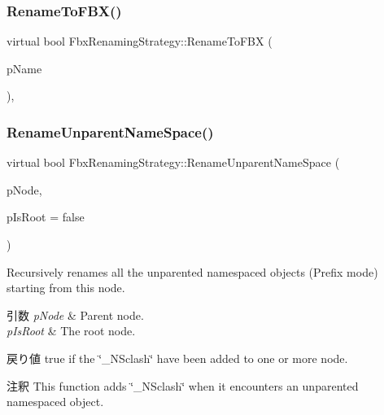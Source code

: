 \subsubsection{\texorpdfstring{Rename\+To\+F\+B\+X()}{RenameToFBX()}}
{\footnotesize\ttfamily virtual bool Fbx\+Renaming\+Strategy\+::\+Rename\+To\+F\+BX (\begin{DoxyParamCaption}\item[{\hyperlink{class_fbx_name_handler}{Fbx\+Name\+Handler} \&}]{p\+Name }\end{DoxyParamCaption})\hspace{0.3cm}{\ttfamily [protected]}, {\ttfamily [virtual]}}

\mbox{\label{class_fbx_renaming_strategy_abc91bd710f488bc42bac3e19b1b3eda2}} 
\subsubsection{\texorpdfstring{Rename\+Unparent\+Name\+Space()}{RenameUnparentNameSpace()}}
{\footnotesize\ttfamily virtual bool Fbx\+Renaming\+Strategy\+::\+Rename\+Unparent\+Name\+Space (\begin{DoxyParamCaption}\item[{\hyperlink{class_fbx_node}{Fbx\+Node} $\ast$}]{p\+Node,  }\item[{bool}]{p\+Is\+Root = {\ttfamily false} }\end{DoxyParamCaption})\hspace{0.3cm}{\ttfamily [virtual]}}

Recursively renames all the unparented namespaced objects (Prefix mode) starting from this node. 
\begin{DoxyParams}{引数}
{\em p\+Node} & Parent node. \\
\hline
{\em p\+Is\+Root} & The root node. \\
\hline
\end{DoxyParams}
\begin{DoxyReturn}{戻り値}
{\ttfamily true} if the \char`\"{}\+\_\+\+N\+Sclash\char`\"{} have been added to one or more node. 
\end{DoxyReturn}
\begin{DoxyRemark}{注釈}
This function adds \char`\"{}\+\_\+\+N\+Sclash\char`\"{} when it encounters an unparented namespaced object. 
\end{DoxyRemark}
\mbox{\label{class_fbx_renaming_strategy_a1dfe24b0ef385ef1b4022fd140224a78}} 
